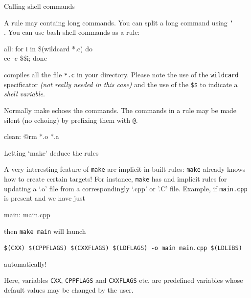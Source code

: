 \documentclass[10pt,aspectratio=169]{beamer}
\newcommand{\blue}{\color{blue}}
\begin{document}
\begin{frame}{Calling shell commands}
    
    A rule may containg long commands. 
    You can split a long command using
    \texttt{\char`\\}. You can use bash shell commands as a rule:
    \begin{semiverbatim}
        all:\newline
        \phantom{xx}	for i in \$(wildcard *.c) do \\ \newline
        cc -c \$\$i; done  
    \end{semiverbatim}
    compiles all the file \texttt{*.c} in your directory. Please note the
    use of the \texttt{wildcard} specificator \emph{(not really needed in this
        case)} and the use of the \texttt{\$\$} 
    to indicate a \emph{shell variable}.
    \medskip
    
    Normally make echoes the commands. The commands in a rule may be made
    silent (no echoing) by prefixing them with \texttt{@}.
    \begin{semiverbatim}
        clean:\newline
        \phantom{xx}	@rm *.o *.a  
    \end{semiverbatim}
  \end{frame}



\begin{frame}{Letting `make' deduce the rules} 

A very interesting feature of \texttt{make} are \alert{implicit} in-built rules: \texttt{make} already knows
how to create certain targets!
For instance, \texttt{make} has  and \alert{implicit rules} for
updating a `.o' file from a correspondingly `.cpp'  or '.C' file. Example, if \texttt{main.cpp} is present
and we have just 
\begin{semiverbatim}
	main: main.cpp
\end{semiverbatim}
then \texttt{make main} will launch
\smallskip

{\scriptsize
\texttt{\$(CXX) \$(CPPFLAGS) \$(CXXFLAGS) \$(LDFLAGS) -o main main.cpp \$(LDLIBS)} 
}
\smallskip

automatically!
\smallskip

Here, variables \texttt{CXX}, \texttt{CPPFLAGS} and \texttt{CXXFLAGS} etc. are \alert{predefined variables}
whose default values may be {\blue changed by the user}.
\end{frame}
\end{document}

